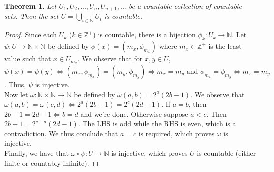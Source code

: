 \documentclass[12pt, a4paper, titlepage, twoside]{article}
\newcommand*{\N}{\mathbb{N}}
\newcommand*{\Z}{\mathbb{Z}}
\newtheorem*{theorem*}{Theorem}
\begin{document}
	\begin{pf}
		\label{apA:ctble-union}
		\begin{theorem*}
			Let $U_1, U_2, ..., U_n, U_{n+1}, ...$ be a countable collection of countable sets. Then the set $U = \bigcup_{i \in \N} U_i$
			is countable.
		\end{theorem*}

		\tcbline		
		
		\begin{proof}
			Since each $U_k$ ($k \in \Z^+$) is countable, there is a bijection $\phi_k : U_k \to \N$. Let $\psi : U \to \N \times \N$ be defined
			by $\phi(x) = (m_x, \phi_{m_x})$ where $m_x \in \Z^+$ is the least value such that $x \in U_{m_x}$. We observe that for 
			$x,y \in U$, 
			$\psi(x) = \psi(y) \iff (m_x, \phi_{m_x}) = (m_y, \phi_{m_y}) \iff m_x = m_y \text{ and } \phi_{m_x} = \phi_{m_y} \iff m_x = m_y$.
			Thus, $\psi$ is injective.\\
			
			Now let $\omega : \N \times \N \to \N$ be defined by $\omega(a,b) = 2^a(2b-1)$. We observe that $\omega(a,b) = \omega(c,d)
			\iff 2^a(2b-1) = 2^c(2d-1)$. If $a = b$, then $2b-1 = 2d-1 \iff b = d$ and we're done. Otherwise suppose $a<c$. Then
			$2b-1 = 2^{c-a}(2d-1)$. The LHS is odd while the RHS is even, which is a contradiction. We thus conclude that $a=c$ is required,
			which proves $\omega$ is injective.\\
			
			Finally, we have that $\omega \circ \psi : U \to \N$ is injective, which proves $U$ is countable (either finite or countably-infinite).
		\end{proof}
	\end{pf}
	
	\hfill
	
\end{document}
